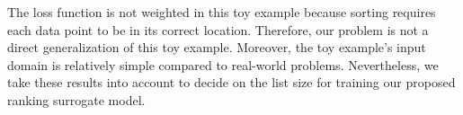 \documentclass[12pt, twoside, ngerman]{report}
\begin{document}
The loss function is not weighted in this toy example because sorting requires each data point to be in its correct location.
Therefore,  our problem is not a direct generalization of this toy example.
Moreover, the toy example's input domain is relatively simple compared to real-world problems.
Nevertheless,  we take these results into account to decide on the list size for training our proposed ranking surrogate model.

\end{document}
